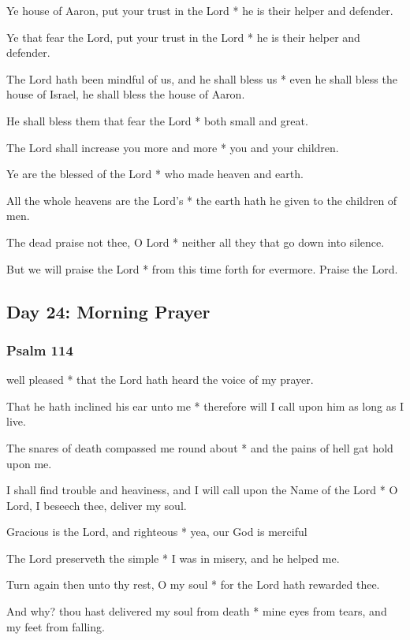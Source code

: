Ye house of Aaron, put your trust in the Lord * he is their helper and defender.

Ye that fear the Lord, put your trust in the Lord * he is their helper and defender.

The Lord hath been mindful of us, and he shall bless us * even he shall bless the house of Israel, he shall bless the house of Aaron.

He shall bless them that fear the Lord * both small and great.

The Lord shall increase you more and more * you and your children.

Ye are the blessed of the Lord * who made heaven and earth.

All the whole heavens are the Lord's * the earth hath he given to the children of men.

The dead praise not thee, O Lord * neither all they that go down into silence.

But we will praise the Lord * from this time forth for evermore. Praise the Lord.

\subsection{Day 24: Morning Prayer}

\subsubsection{Psalm 114}


 well pleased * that the Lord hath heard the voice of my prayer.

That he hath inclined his ear unto me * therefore will I call upon him as long as I live.

The snares of death compassed me round about * and the pains of hell gat hold upon me.

I shall find trouble and heaviness, and I will call upon the Name of the Lord * O Lord, I beseech thee, deliver my soul.

Gracious is the Lord, and righteous * yea, our God is merciful

The Lord preserveth the simple * I was in misery, and he helped me.

Turn again then unto thy rest, O my soul * for the Lord hath rewarded thee.

And why? thou hast delivered my soul from death * mine eyes from tears, and my feet from falling.

